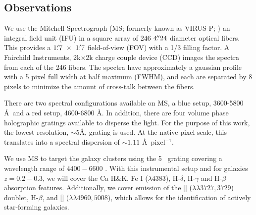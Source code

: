 \subsection{Observations} 
We use the Mitchell Spectrograph (MS; formerly known as VIRUS-P; \citealt{Hill2008a}) an integral field unit (IFU) in a square array of 246 $4\mbox{\ensuremath{.\!\!^{\prime\prime}}}24$ diameter optical fibers. This provides a $1\mbox{\ensuremath{.\mkern-4mu^\prime}}7~\times~1\mbox{\ensuremath{.\mkern-4mu^\prime}}7$ field-of-view (FOV) with a 1/3 filling factor. A Fairchild Instruments, 2k$\times$2k charge couple device (CCD) images the spectra from each of the 246 fibers. The spectra have approximately a gaussian profile with a 5 pixel full width at half maximum (FWHM), and each are separated by 8 pixels to minimize the amount of cross-talk between the fibers. 

There are two spectral configurations available on MS, a blue setup, 3600-5800 \AA\ and a red setup, 4600-6800 \AA. In addition, there are four volume phase holographic gratings available to disperse the light. For the purpose of this work, the lowest resolution, $\sim5$\AA, grating is used. At the native pixel scale, this translates into a spectral dispersion of $\sim1.11$ \AA\ pixel$^{-1}$. 

We use MS to target the galaxy clusters using the 5 \AAA\ grating covering a wavelength range of $4400 - 6600$ \AAA. With this instrumental setup and for galaxies $z = 0.2-0.3$, we will cover the Ca H\&K, Fe I ($\lambda 4383$), H-$\delta$, H-$\gamma$ and H-$\beta$ absorption features. Additionally, we cover emission of the [] ($\lambda\lambda 3727,3729$) doublet, H-$\beta$, and [] ($\lambda\lambda 4960,5008$), which allows for the identification of actively star-forming galaxies.

